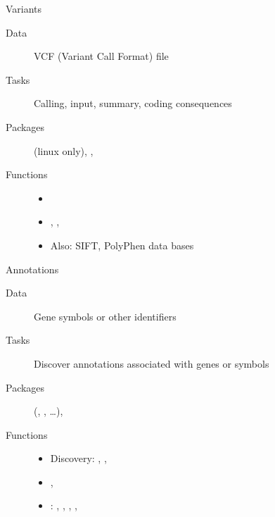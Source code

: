 \documentclass[xcolor=dvipsnames]{beamer}\usepackage[]{graphicx}\usepackage[]{color}
\begin{document}
\begin{frame}{Variants}
  \begin{description}
  \item[Data] VCF (Variant Call Format) file
  \item[Tasks] Calling, input, summary, coding consequences
  \item[Packages]  (linux only),
    , 
  \item[Functions]
    \begin{itemize}
    \item {}
    \item {}, ,
    \item Also: SIFT, PolyPhen data bases
    \end{itemize}
  \end{description}
\end{frame}

\begin{frame}{Annotations}
  \begin{description}
  \item[Data] Gene symbols or other identifiers
  \item[Tasks] Discover annotations associated with genes or symbols
  \item[Packages]  (,
    , \ldots), 
  \item[Functions]
    \begin{itemize}
    \item Discovery: , ,
    \item {}, 
    \item {}: ,
      , ,
      , 
    \end{itemize}
  \end{description}
\end{frame}
\end{document}
